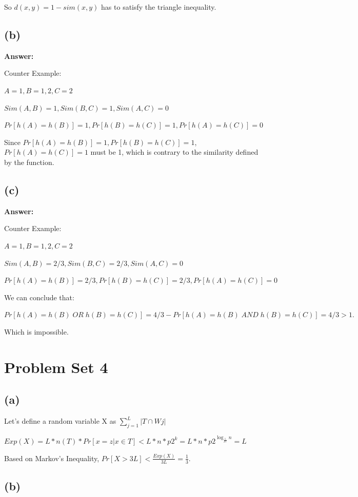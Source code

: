 \documentclass{article}
\begin{document}
So $d(x, y) = 1 - sim(x, y)$ has to satisfy the triangle inequality.

\subsection{(b)}

\textbf{Answer:}

Counter Example: 

$A = {1}, B = {1, 2}, C = {2}$

$Sim(A, B) = 1, Sim(B, C) = 1, Sim(A, C) = 0$

$Pr[h(A) = h(B)] = 1, Pr[h(B) = h(C)] = 1, Pr[h(A) = h(C)] = 0$

Since $Pr[h(A) = h(B)] = 1, Pr[h(B) = h(C)] = 1$, $Pr[h(A) = h(C)] = 1$ must be 1, which is contrary to the similarity defined by the function.


\subsection{(c)}

\textbf{Answer:}

Counter Example: 

$A = {1}, B = {1, 2}, C = {2}$

$Sim(A, B) = 2/3, Sim(B, C) = 2/3, Sim(A, C) = 0$

$Pr[h(A) = h(B)] = 2/3, Pr[h(B) = h(C)] = 2/3, Pr[h(A) = h(C)] = 0$

We can conclude that:

$Pr[h(A) = h(B)\;OR\;h(B) = h(C)] = 4/3 - Pr[h(A) = h(B)\;AND\;h(B) = h(C)] = 4/3 > 1.$

Which is impossible.


\section{Problem Set 4}

\subsection{(a)}
Let's define a random variable X as $\sum\nolimits_{j=1}^L |T \cap Wj|$

$Exp(X) = L * n(T) * Pr[x = z | x \in T ] < L * n * p2^k = L * n * p2^{\log_\frac{1}{p2} n} = L$

Based on Markov's Inequality, $Pr[X > 3L] < \frac{Exp(X)}{3L} = \frac{1}{3}$.

\subsection{(b)}
\end{document}
